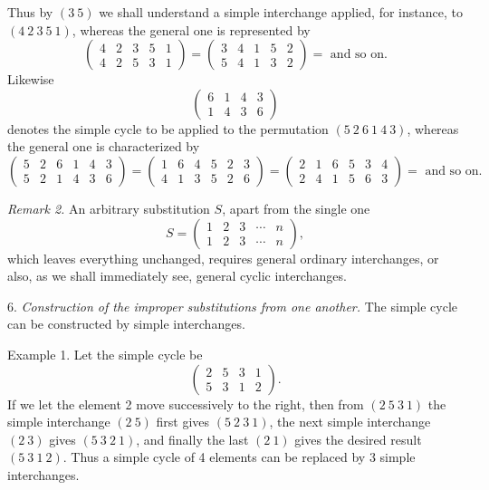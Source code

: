 \documentclass[10pt]{article}
\begin{document}
Thus by \((3\ 5)\) we shall understand a simple interchange applied, for instance, to \((4\ 2\ 3\ 5\ 1)\), whereas the general one is represented by
\[
\begin{pmatrix}4&2&3&5&1\\4&2&5&3&1\end{pmatrix}
=
\begin{pmatrix}3&4&1&5&2\\5&4&1&3&2\end{pmatrix}
=\text{ and so on.}
\]
Likewise
\[
\begin{pmatrix}6&1&4&3\\1&4&3&6\end{pmatrix}
\]
denotes the simple cycle to be applied to the permutation \((5\ 2\ 6\ 1\ 4\ 3)\), whereas the general one is characterized by
\[
\begin{pmatrix}5&2&6&1&4&3\\5&2&1&4&3&6\end{pmatrix}
=
\begin{pmatrix}1&6&4&5&2&3\\4&1&3&5&2&6\end{pmatrix}
=
\begin{pmatrix}2&1&6&5&3&4\\2&4&1&5&6&3\end{pmatrix}
=\text{ and so on.}
\]

\emph{Remark 2.} An arbitrary substitution \(S\), apart from the single one
\[
S=\begin{pmatrix}1&2&3&\cdots&n\\1&2&3&\cdots&n\end{pmatrix},
\]
which leaves everything unchanged, requires general ordinary interchanges, or also, as we shall immediately see, general cyclic interchanges.

6. \emph{Construction of the improper substitutions from one another.} The simple cycle can be constructed by simple interchanges.

Example 1. Let the simple cycle be
\[
\begin{pmatrix}2&5&3&1\\5&3&1&2\end{pmatrix}.
\]
If we let the element 2 move successively to the right, then from \((2\ 5\ 3\ 1)\) the simple interchange \((2\ 5)\) first gives \((5\ 2\ 3\ 1)\), the next simple interchange \((2\ 3)\) gives \((5\ 3\ 2\ 1)\), and finally the last \((2\ 1)\) gives the desired result \((5\ 3\ 1\ 2)\). Thus a simple cycle of 4 elements can be replaced by 3 simple interchanges.
\end{document}
